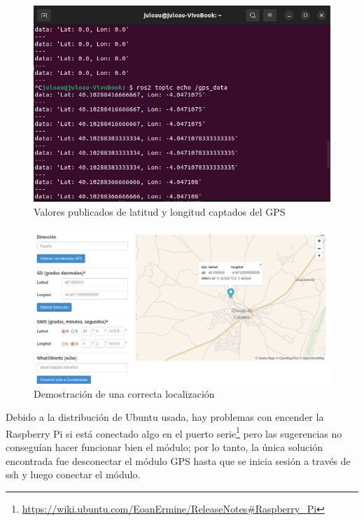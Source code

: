  \begin{figure} [h!]
	\begin{center}
		\includegraphics[width=12cm]{figs/cap6/echo_gps_controller.png}
	\end{center}
	\caption{Valores publicados de latitud y longitud captados del GPS}
	\label{fig:gpsnode}
\end{figure}


 \begin{figure} [h!]
	\begin{center}
		\includegraphics[width=15cm]{figs/cap6/localizacion.png}
	\end{center}
	\caption{Demostración de una correcta localización}
	\label{fig:demogpsnode}
\end{figure}

Debido a la distribución de Ubuntu usada, hay problemas con encender la Raspberry Pi si está conectado algo en el puerto serie\footnote{\url{https://wiki.ubuntu.com/EoanErmine/ReleaseNotes\#Raspberry_Pi}} pero las sugerencias no conseguían hacer funcionar bien el módulo; por lo tanto, la única solución encontrada fue desconectar el módulo \acs{GPS} hasta que se inicia sesión a través de ssh y luego conectar el módulo.

